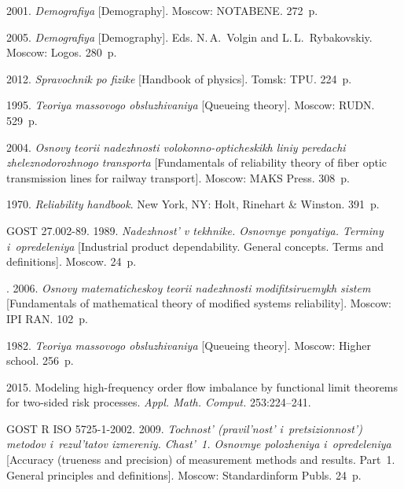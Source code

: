 \begin{multicols}{2}
{{\begin{thebibliography}{99}
 2001. \textit{Demografiya} [Demography]. 
Moscow: NOTABENE. 272~p.

 2005. 
\textit{Demografiya} [Demography]. Eds. N.\,A.~Volgin and
L.\,L.~Rybakovskiy. Moscow: Logos. 280~p.

 2012. 
\textit{Spravochnik po fizike} [Handbook of physics]. Tomsk: TPU. 224~p.

 1995. 
\textit{Teoriya massovogo obsluzhivaniya} [Queueing theory]. Moscow: RUDN. 529~p.

 2004. 
\textit{Osnovy teorii nadezhnosti volokonno-opticheskikh liniy peredachi 
zheleznodorozhnogo transporta} [Fundamentals of reliability theory 
of fiber optic transmission lines for railway transport]. Moscow: MAKS Press. 308~p.

 1970. 
\textit{Reliability handbook}. New York, NY: Holt, Rinehart \& Winston.  391~p.

\columnbreak

GOST 27.002-89. 1989. 
\textit{Nadezhnost' v tekhnike. Osnovnye ponyatiya. Terminy i~opredeleniya} 
[Industrial product dependability. General concepts. 
Terms and definitions]. Moscow. 24~p.

. 2006. 
\textit{Osnovy ma\-te\-ma\-ti\-che\-skoy teorii nadezhnosti modifitsiruemykh sistem} 
[Fundamentals of mathematical theory of modified systems reliability]. 
Moscow: IPI RAN. 102~p.

 1982. 
\textit{Teoriya massovogo obsluzhivaniya} [Queueing theory]. Moscow: Higher school. 256~p.

 2015. 
Modeling high-frequency order flow imbalance by functional limit theorems 
for two-sided risk processes. \textit{Appl. Math. Comput.} 253:224--241.

GOST R ISO 5725-1-2002. 2009. \textit{Tochnost' (pravil'nost' i~pretsizionnost') 
metodov i~rezul'tatov izmereniy. Chast'~1. Osnovnye polozheniya i~opredeleniya} 
[Accuracy (trueness and precision) of measurement methods and results. Part~1. 
General principles and definitions]. Moscow: Standardinform Publs. 24~p.


\end{thebibliography}}}
\end{multicols}
